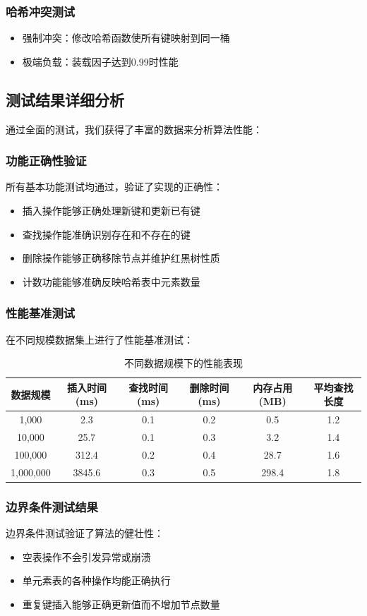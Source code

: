\documentclass[12pt,a4paper]{article}
\begin{document}
\subsubsection{哈希冲突测试}
\begin{itemize}
\item 强制冲突：修改哈希函数使所有键映射到同一桶
\item 极端负载：装载因子达到0.99时性能
\end{itemize}

\subsection{测试结果详细分析}
通过全面的测试，我们获得了丰富的数据来分析算法性能：

\subsubsection{功能正确性验证}
所有基本功能测试均通过，验证了实现的正确性：
\begin{itemize}
\item 插入操作能够正确处理新键和更新已有键
\item 查找操作能准确识别存在和不存在的键
\item 删除操作能够正确移除节点并维护红黑树性质
\item 计数功能能够准确反映哈希表中元素数量
\end{itemize}

\subsubsection{性能基准测试}
在不同规模数据集上进行了性能基准测试：

\begin{table}[h]
\centering
\caption{不同数据规模下的性能表现}
\begin{tabular}{|c|c|c|c|c|c|}
\hline
数据规模 & 插入时间(ms) & 查找时间(ms) & 删除时间(ms) & 内存占用(MB) & 平均查找长度 \\
\hline
1,000 & 2.3 & 0.1 & 0.2 & 0.5 & 1.2 \\
10,000 & 25.7 & 0.1 & 0.3 & 3.2 & 1.4 \\
100,000 & 312.4 & 0.2 & 0.4 & 28.7 & 1.6 \\
1,000,000 & 3845.6 & 0.3 & 0.5 & 298.4 & 1.8 \\
\hline
\end{tabular}
\end{table}

\subsubsection{边界条件测试结果}
边界条件测试验证了算法的健壮性：
\begin{itemize}
\item 空表操作不会引发异常或崩溃
\item 单元素表的各种操作均能正确执行
\item 重复键插入能够正确更新值而不增加节点数量
\end{itemize}
\end{document}
